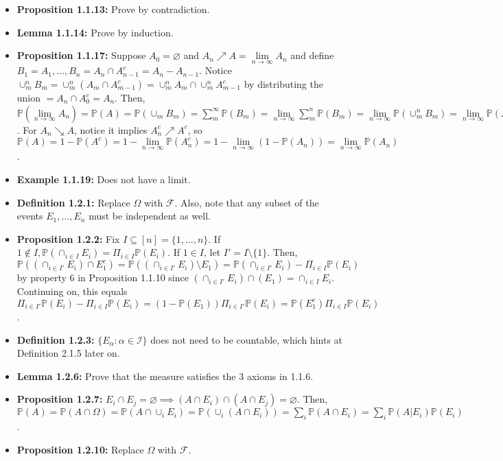 \documentclass[12pt]{article}
\newcommand{\p}{\mathbb{P}}
\begin{document}
\begin{itemize}
    \item \textbf{Proposition 1.1.13:} Prove by contradiction.
    \item \textbf{Lemma 1.1.14:} Prove by induction.
    \item \textbf{Proposition 1.1.17:} Suppose $A_0 = \varnothing$ and $A_n \nearrow A = \lim \limits_{n \to \infty} A_n$ and define $B_1 = A_1, \ldots, B_n = A_n \cap A_{n-1}^c = A_n - A_{n-1}$. Notice $\cup_m^n B_m = \cup_m^n (A_m \cap A_{m-1}^c) = \cup_m^n A_m \cap \cup_m^n A_{m-1}^c$ by distributing the union $= A_n \cap A_0^c = A_n$. Then, $\p(\lim \limits_{n \to \infty} A_n) = \p(A) = \p(\cup_m B_m) = \sum_m^{\infty} \p(B_m) = \lim \limits_{n \to \infty} \sum_m^n \p(B_m) = \lim \limits_{n \to \infty} \p(\cup_m^n B_m) = \lim \limits_{n \to \infty} \p(A_n)$. For $A_n \searrow A$, notice it implies $A_n^c \nearrow A^c$, so $\p(A) = 1 - \p(A^c) = 1 - \lim \limits_{n \to \infty} \p(A_n^c) = 1 - \lim \limits_{n \to \infty} (1 - \p(A_n)) = \lim \limits_{n \to \infty} \p(A_n)$.
    \item \textbf{Example 1.1.19:} Does not have a limit.
    \item \textbf{Definition 1.2.1:} Replace $\Omega$ with $\mathcal{F}$. Also, note that any subset of the events $E_1, \ldots, E_n$ must be independent as well.
    \item \textbf{Proposition 1.2.2:} Fix $I \subseteq [n] = \{1, \ldots, n\}$. If $1 \notin I, \p(\cap_{i \in I} E_i) = \Pi_{i \in I} \p(E_i)$. If $1 \in I$, let $I' = I \setminus \{1\}$. Then, $\p((\cap_{i \in I'} E_i) \cap E_1^c) = \p((\cap_{i \in I'} E_i) \setminus E_1) = \p(\cap_{i \in I'} E_i) - \Pi_{i \in I} \p(E_i)$ by property 6 in Proposition 1.1.10 since $(\cap_{i \in I'} E_i) \cap (E_1) = \cap_{i \in I} E_i$. Continuing on, this equals $\Pi_{i \in I'} \p(E_i) - \Pi_{i \in I} \p(E_i) = (1 - \p(E_1)) \Pi_{i \in I'} \p(E_i) = \p(E_1^c) \Pi_{i \in I} \p(E_i)$.
    \item \textbf{Definition 1.2.3:} $\{E_\alpha: \alpha \in \mathcal{I}\}$ does not need to be countable, which hints at Definition 2.1.5 later on.
    \item \textbf{Lemma 1.2.6:} Prove that the measure satisfies the 3 axioms in 1.1.6.
    \item \textbf{Proposition 1.2.7:} $E_i \cap E_j = \varnothing \implies (A \cap E_i) \cap (A \cap E_j) = \varnothing$. Then, $\p(A) = \p(A \cap \Omega) = \p(A \cap \cup_i E_i) = \p(\cup_i (A \cap E_i)) = \sum_i \p(A \cap E_i) = \sum_i \p(A|E_i)\p(E_i)$.
    \item \textbf{Proposition 1.2.10:} Replace $\Omega$ with $\mathcal{F}$.
\end{itemize}
\end{document}
